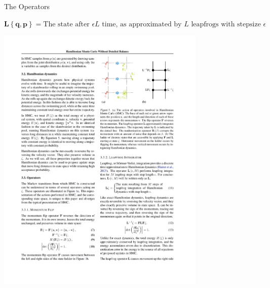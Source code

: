 \documentclass{beamer}
\renewcommand{\vec}[1]{\ensuremath{\mathbf{#1}}}
\newcommand{\op}[1]{\ensuremath{\mathbf{#1}}}
\begin{document}
    \begin{frame}{The Operators}
        
        \begin{definition}
            $\op{L}\left\{\vec{q},\vec{p}\right\} = \text{The state after } \epsilon L \text{ time, as approximated by } L \text{ leapfrogs with stepsize } \epsilon$
        \end{definition}
        
        \vfill
        
        \centering
        \includegraphics[width=0.75\textwidth]{L.pdf}
        
    \end{frame}
    
\end{document}

